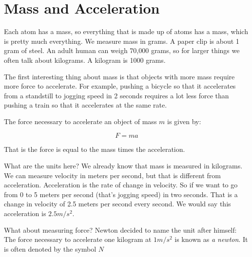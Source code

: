 \section{Mass and Acceleration}

Each atom has a mass, so everything that is made up of atoms has a
mass, which is pretty much everything.  We measure mass in grams.  A
paper clip is about 1 gram of steel. An adult human can weigh 70,000
grams, so for larger things we often talk about kilograms. A kilogram
is 1000 grams.

The first interesting thing about mass is that objects with more mass
require more force to accelerate. For example, pushing a bicycle so
that it accelerates from a standstill to jogging speed in 2 seconds
requires a lot less force than pushing a train so that it accelerates
at the same rate.


\begin{mdframed}[style=important, frametitle={Newton's Second Law of Motion}]

The force necessary to accelerate an object of mass $m$ is given by:

$$F = m a$$

That is the force is equal to the mass times the acceleration.

\end{mdframed}

What are the units here? We already know that mass is measured in
kilograms. We can measure velocity in meters per second, but that is
different from acceleration. Acceleration is the rate of change in
velocity. So if we want to go from 0 to 5 meters per second (that's
jogging speed) in two seconds. That is a change in velocity of 2.5
meters per second every second. We would say this acceleration is $2.5
m/s^2$.

What about measuring force? Newton decided to name the unit after
himself: The force necessary to accelerate one kilogram at $1 m/s^2$
is known as \textit{a newton}. It is often denoted by the symbol $N$

